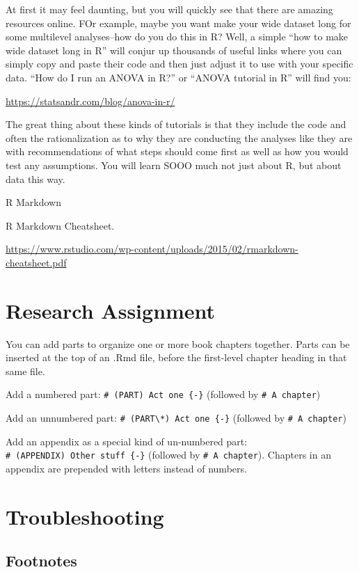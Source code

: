 \documentclass[
]{html}
\theoremstyle{definition}
\theoremstyle{definition}
\theoremstyle{definition}
\theoremstyle{definition}
\theoremstyle{remark}
\begin{document}
At first it may feel daunting, but you will quickly see that there are amazing resources online. FOr example, maybe you want make your wide dataset long for some multilevel analyses--how do you do this in R? Well, a simple ``how to make wide dataset long in R'' will conjur up thousands of useful links where you can simply copy and paste their code and then just adjust it to use with your specific data. ``How do I run an ANOVA in R?'' or ``ANOVA tutorial in R'' will find you:

\url{https://statsandr.com/blog/anova-in-r/}

The great thing about these kinds of tutorials is that they include the code and often the rationalization as to why they are conducting the analyses like they are with recommendations of what steps should come first as well as how you would test any assumptions. You will learn SOOO much not just about R, but about data this way.

R Markdown

R Markdown Cheatsheet.

\url{https://www.rstudio.com/wp-content/uploads/2015/02/rmarkdown-cheatsheet.pdf}

\hypertarget{research-assignment}{%
\section{Research Assignment}\label{research-assignment}}

You can add parts to organize one or more book chapters together. Parts can be inserted at the top of an .Rmd file, before the first-level chapter heading in that same file.

Add a numbered part: \texttt{\#\ (PART)\ Act\ one\ \{-\}} (followed by \texttt{\#\ A\ chapter})

Add an unnumbered part: \texttt{\#\ (PART\textbackslash{}*)\ Act\ one\ \{-\}} (followed by \texttt{\#\ A\ chapter})

Add an appendix as a special kind of un-numbered part: \texttt{\#\ (APPENDIX)\ Other\ stuff\ \{-\}} (followed by \texttt{\#\ A\ chapter}). Chapters in an appendix are prepended with letters instead of numbers.

\hypertarget{troubleshooting}{%
\section{Troubleshooting}\label{troubleshooting}}

\hypertarget{footnotes}{%
\subsection{Footnotes}\label{footnotes}}
\end{document}
